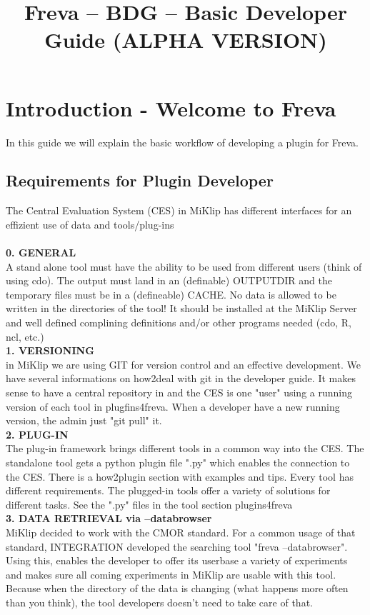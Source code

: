 \documentclass[a4paper,11pt]{ltxdoc}
\title{Freva -- BDG -- Basic Developer Guide (ALPHA VERSION)}
\begin{document}
\maketitle

\section{Introduction - Welcome to Freva}
In this guide we will explain the basic workflow of developing a plugin for Freva.
\subsection{Requirements for Plugin Developer}
The Central Evaluation System (CES) in MiKlip has different interfaces for an effizient use of data and tools/plug-ins\\
\\
\textbf{0. GENERAL}\\
A stand alone tool must have the ability to be used from different users (think of using cdo). The output must land in an (definable) OUTPUTDIR and the temporary files must be in a (defineable) CACHE. No data is allowed to be written in the directories of the tool! It should be installed at the MiKlip Server and well defined complining definitions and/or other programs needed (cdo, R, ncl, etc.) \\

\textbf{1. VERSIONING}\\
in MiKlip we are using GIT for version control and an effective development. We have several informations on how2deal with git in the developer guide.
It makes sense to have a central repository in and the CES is one "user" using a running version of each tool in plugfins4freva. When a developer have a new running version, the admin just "git pull" it.\\

\textbf{2. PLUG-IN}\\
The plug-in framework brings different tools in a common way into the CES. The standalone tool gets a python plugin file ".py" which enables the connection to the CES. There is a how2plugin section with examples and tips. Every tool has different requirements. The plugged-in tools offer a variety of solutions for different tasks. See the ".py" files in the tool section plugins4freva\\

\textbf{3. DATA RETRIEVAL via --databrowser}\\
MiKlip decided to work with the CMOR standard. For a common usage of that standard, INTEGRATION developed the searching tool "freva --databrowser". Using this, enables the developer to offer its userbase a variety of experiments and makes sure all coming experiments in MiKlip are usable with this tool. Because when the directory of the data is changing (what happens more often than you think), the tool developers doesn't need to take care of that.\\
\end{document}
